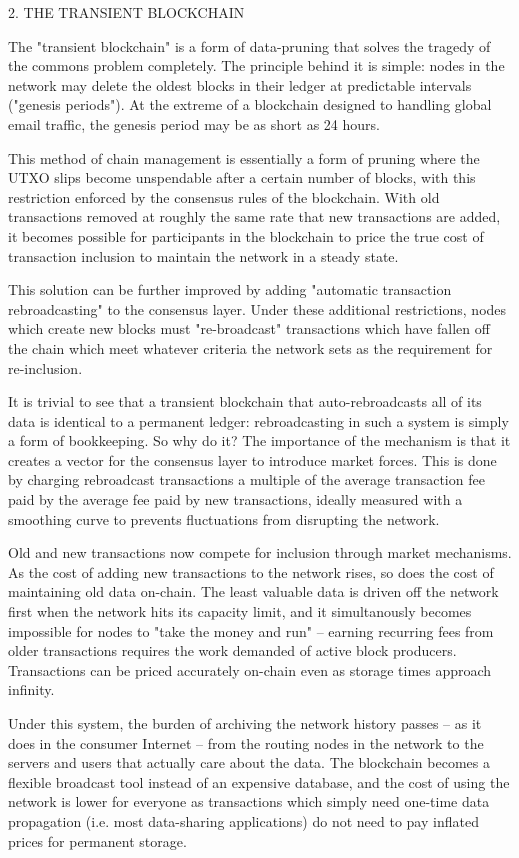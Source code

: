 \documentclass[11.5pt, oneside]{article}   	%
\begin{document}
\begin{multicols}{2}
2. THE TRANSIENT BLOCKCHAIN

The "transient blockchain" is a form of data-pruning that solves the tragedy of the commons problem completely. The principle behind it is simple: nodes in the network may delete the oldest blocks in their ledger at predictable intervals ("genesis periods"). At the extreme of a blockchain designed to handling global email traffic, the genesis period may be as short as 24 hours.

This method of chain management is essentially a form of pruning where the UTXO slips become unspendable after a certain number of blocks, with this restriction enforced by the consensus rules of the blockchain. With old transactions removed at roughly the same rate that new transactions are added, it becomes possible for participants in the blockchain to price the true cost of transaction inclusion to maintain the network in a steady state.

This solution can be further improved by adding "automatic transaction rebroadcasting" to the consensus layer. Under these additional restrictions, nodes which create new blocks must "re-broadcast" transactions which have fallen off the chain which meet whatever criteria the network sets as the requirement for re-inclusion.

It is trivial to see that a transient blockchain that auto-rebroadcasts all of its data is identical to a permanent ledger: rebroadcasting in such a system is simply a form of bookkeeping. So why do it? The importance of the mechanism is that it creates a vector for the consensus layer to introduce market forces. This is done by charging rebroadcast transactions a multiple of the average transaction fee paid by the average fee paid by new transactions, ideally measured with a smoothing curve to prevents fluctuations from disrupting the network.

Old and new transactions now compete for inclusion through market mechanisms. As the cost of adding new transactions to the network rises, so does the cost of maintaining old data on-chain. The least valuable data is driven off the network first when the network hits its capacity limit, and it simultanously becomes impossible for nodes to "take the money and run" -- earning recurring fees from older transactions requires the work demanded of active block producers. Transactions can be priced accurately on-chain even as storage times approach infinity.

Under this system, the burden of archiving the network history passes -- as it does in the consumer Internet -- from the routing nodes in the network to the servers and users that actually care about the data. The blockchain becomes a flexible broadcast tool instead of an expensive database, and the cost of using the network is lower for everyone as transactions which simply need one-time data propagation (i.e. most data-sharing applications) do not need to pay inflated prices for permanent storage.


\end{multicols}
\end{document}
